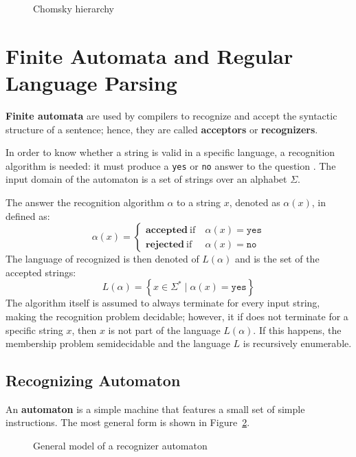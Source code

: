 \documentclass[english]{article}
\begin{document}
\begin{figure}[htbp]
  \bigskip
  \centering
  \caption{Chomsky hierarchy}
  \label{fig:chomsky-hierarchy}
  \bigskip
\end{figure}

\clearpage

\section{Finite Automata and Regular Language Parsing}
\label{sec:finite-automata}

\textbf{Finite automata} are used by compilers to recognize and accept the syntactic structure of a sentence;
hence, they are called \textbf{acceptors} or \textbf{recognizers}.

In order to know whether a string is valid in a specific language, a recognition algorithm is needed: it must produce a \texttt{yes} or \texttt{no} answer to the question .
The input domain of the automaton is a set of strings over an alphabet \(\Sigma\).

The answer the recognition algorithm \(\alpha\) to a string \(x\), denoted as \(\alpha(x)\), in defined as:
\[ \alpha(x) = \begin{cases}
    \textbf{accepted} \ \text{if} \  & \alpha(x) = \texttt{yes} \\
    \textbf{rejected} \ \text{if} \  & \alpha(x) = \texttt{no}
  \end{cases}\]
The language of recognized is then denoted of \(L(\alpha)\) and is the set of the accepted strings:
\[ L(\alpha) = \left\{ x \in \Sigma^\ast \mid \alpha(x) = \texttt{yes} \right\}\]
The algorithm itself is assumed to always terminate for every input string, making the recognition problem decidable;
however, it if does not terminate for a specific string \(x\), then \(x\) is not part of the language \(L(\alpha)\).
If this happens, the membership problem semidecidable and the language \(L\) is recursively enumerable.

\subsection{Recognizing Automaton}
\label{sec:recognizing-automaton}

An \textbf{automaton} is a simple machine that features a small set of simple instructions.
The most general form is shown in Figure~\ref{fig:automaton}.

\begin{figure}[hbtp]
  \centering
  \bigskip
  \caption{General model of a recognizer automaton}
  \label{fig:automaton}
  \bigskip
\end{figure}
\end{document}

